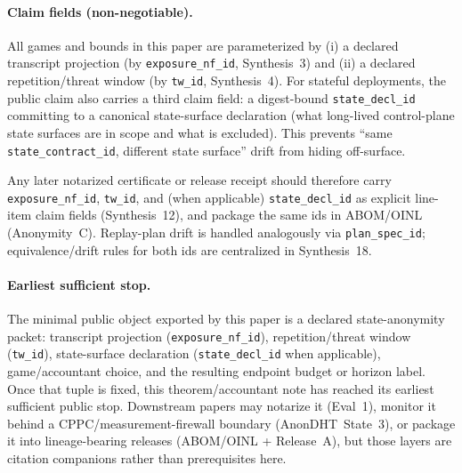 \documentclass[11pt]{article}
\begin{document}
\paragraph{Claim fields (non-negotiable).}
All games and bounds in this paper are parameterized by
(i) a declared transcript projection (by \texttt{exposure\_nf\_id}, Synthesis~3) and
(ii) a declared repetition/threat window (by \texttt{tw\_id}, Synthesis~4).\cite{series:traceifaces,series:threatwindows}
For stateful deployments, the public claim also carries a third claim field:
a digest-bound \texttt{state\_decl\_id} committing to a canonical state-surface declaration (what long-lived control-plane state surfaces are in scope and what is excluded).\cite{series:planstateequiv,series:workedexample}
This prevents ``same \texttt{state\_contract\_id}, different state surface'' drift from hiding off-surface.

Any later notarized certificate or release receipt should therefore carry \texttt{exposure\_nf\_id}, \texttt{tw\_id}, and (when applicable) \texttt{state\_decl\_id} as explicit line-item claim fields (Synthesis~12), and package the same ids in ABOM/OINL (Anonymity~C).\cite{series:receiptitems,series:abomoinl}
Replay-plan drift is handled analogously via \texttt{plan\_spec\_id}; equivalence/drift rules for both ids are centralized in Synthesis~18.\cite{series:planstateequiv}

\paragraph{Earliest sufficient stop.}
The minimal public object exported by this paper is a declared state-anonymity packet: transcript projection (\texttt{exposure\_nf\_id}), repetition/threat window (\texttt{tw\_id}), state-surface declaration (\texttt{state\_decl\_id} when applicable), game/accountant choice, and the resulting endpoint budget or horizon label.
Once that tuple is fixed, this theorem/accountant note has reached its earliest sufficient public stop. Downstream papers may notarize it (Eval~1), monitor it behind a CPPC/measurement-firewall boundary (AnonDHT~State~3), or package it into lineage-bearing releases (ABOM/OINL + Release~A), but those layers are citation companions rather than prerequisites here.\cite{series:state3,series:evalnotary,series:abomoinl,series:release}
\end{document}
